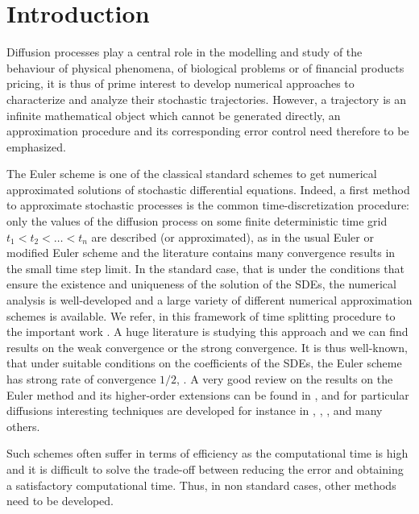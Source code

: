 \documentclass[12pt]{article}
\numberwithin{equation}{section}
\begin{document}
\section*{Introduction}\label{sec:intro}


Diffusion processes play a central role in the modelling and study of the behaviour of physical phenomena, of biological problems or of financial products pricing, it is thus of prime interest to develop numerical approaches to characterize and analyze their stochastic trajectories. However, a trajectory is an infinite mathematical object which cannot be generated directly, an approximation procedure and its corresponding error control need therefore to be emphasized. 
 
The Euler scheme is one of the classical standard schemes to get numerical approximated solutions of stochastic differential equations. Indeed, a first method to approximate stochastic processes is the common time-discretization procedure: only the values of the diffusion process on some finite deterministic time grid $t_1<t_2<\ldots<t_n$ are described (or approximated), as in the usual Euler or modified Euler scheme and the literature contains many convergence results in the small time step limit.
In the standard case, that is under the conditions that ensure the existence and uniqueness of the solution of the SDEs, the numerical analysis is well-developed and a large variety of different numerical approximation schemes is available. We refer, in this framework of time splitting procedure to the important work  \cite{kloedenplaten1999Euler}. 
A huge literature is studying this approach and we can find results on the weak convergence  \cite{bally1995weakeuler} or the strong convergence. It is thus well-known, that under suitable conditions on the coefficients of the SDEs, the Euler scheme has strong rate of convergence $1/2$, \cite{kloedenplaten1999Euler}. A very good review on the results on the Euler method and its higher-order extensions can be found in \cite{jourdainhiga2011euler}, and for particular  diffusions interesting techniques are developed for instance in \cite{dereich2012eulercir}, \cite{gobet2000}, \cite{muller2020eulernonsmooth}, and many others. 

Such schemes often suffer in terms of efficiency as the computational time is high and  it is difficult to solve the trade-off between reducing the error and obtaining a satisfactory computational time. Thus, in non standard cases, other methods need to be developed.
\end{document}

